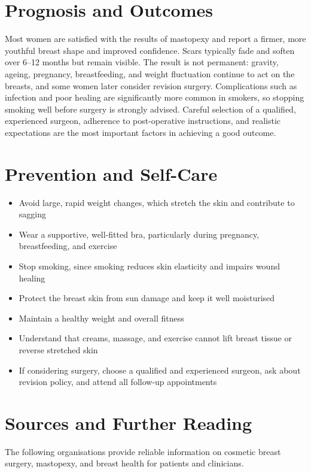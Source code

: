 \section*{Prognosis and Outcomes}
Most women are satisfied with the results of mastopexy and report a firmer, more youthful breast shape and improved confidence. Scars typically fade and soften over 6--12 months but remain visible. The result is not permanent: gravity, ageing, pregnancy, breastfeeding, and weight fluctuation continue to act on the breasts, and some women later consider revision surgery. Complications such as infection and poor healing are significantly more common in smokers, so stopping smoking well before surgery is strongly advised. Careful selection of a qualified, experienced surgeon, adherence to post-operative instructions, and realistic expectations are the most important factors in achieving a good outcome.

\section*{Prevention and Self-Care}
\begin{itemize}
    \item Avoid large, rapid weight changes, which stretch the skin and contribute to sagging
    \item Wear a supportive, well-fitted bra, particularly during pregnancy, breastfeeding, and exercise
    \item Stop smoking, since smoking reduces skin elasticity and impairs wound healing
    \item Protect the breast skin from sun damage and keep it well moisturised
    \item Maintain a healthy weight and overall fitness
    \item Understand that creams, massage, and exercise cannot lift breast tissue or reverse stretched skin
    \item If considering surgery, choose a qualified and experienced surgeon, ask about revision policy, and attend all follow-up appointments
\end{itemize}

\section*{Sources and Further Reading}
The following organisations provide reliable information on cosmetic breast surgery, mastopexy, and breast health for patients and clinicians.

